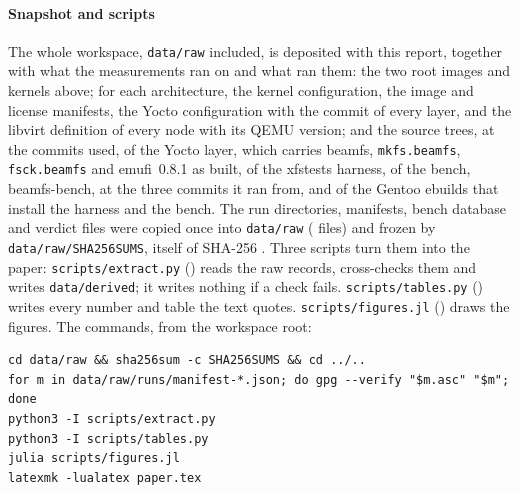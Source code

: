 \paragraph*{Snapshot and scripts}
The whole workspace, \texttt{data/raw} included, is deposited with
this report, together with what the measurements ran on and what ran
them: the two root images and kernels above; for each architecture,
the kernel configuration, the image and license manifests, the Yocto
configuration with the commit of every layer, and the libvirt
definition of every node with its QEMU version; and the source trees,
at the commits used, of the Yocto layer, which carries beamfs,
\texttt{mkfs.beamfs}, \texttt{fsck.beamfs} and emufi~0.8.1 as built,
of the xfstests harness, of the bench, beamfs-bench, at the three
commits it ran from, and of the Gentoo ebuilds that install the
harness and the bench. The run
directories, manifests, bench database and verdict files were
copied once into \texttt{data/raw} (\snapshotFiles{} files) and frozen by
\texttt{data/raw/SHA256SUMS}, itself of SHA-256
\hash{\snapshotSha}. Three scripts turn them into the paper:
\texttt{scripts/extract.py} (\hash{\extractSha}) reads the raw records,
cross-checks them and writes \texttt{data/derived}; it writes nothing if
a check fails. \texttt{scripts/tables.py} (\hash{\tablesSha}) writes
every number and table the text quotes. \texttt{scripts/figures.jl}
(\hash{\figuresSha}) draws the figures. The commands, from the workspace
root:
\begin{lstlisting}
cd data/raw && sha256sum -c SHA256SUMS && cd ../..
for m in data/raw/runs/manifest-*.json; do gpg --verify "$m.asc" "$m"; done
python3 -I scripts/extract.py
python3 -I scripts/tables.py
julia scripts/figures.jl
latexmk -lualatex paper.tex
\end{lstlisting}

